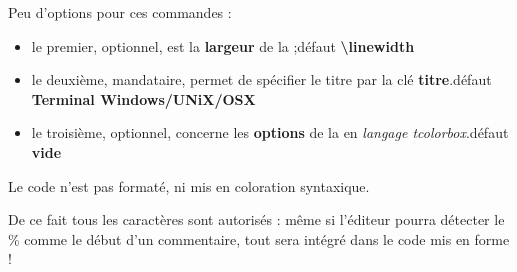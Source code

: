 \documentclass{article}
\newcommand\ctex[1]{\tcbox[vignettelatex]{#1}}
\newcommand\Cle[1]{{\bfseries\sffamily\textlangle #1\textrangle}}
\begin{document}
\begin{codecles}
Peu d'options pour ces commandes :

\begin{itemize}
	\item le premier, optionnel, est la \Cle{largeur} de la \ctex{tcbox} ;\hfill{}défaut \Cle{\textbackslash linewidth}
	\item le deuxième, mandataire, permet de spécifier le titre par la clé \Cle{titre}.\hfill{}défaut \Cle{Terminal Windows/UNiX/OSX}
	\item le troisième, optionnel, concerne les \Cle{options} de la \ctex{tcbox} en \textit{langage tcolorbox}.\hfill{}défaut \Cle{vide}
\end{itemize}
\end{codecles}

\medskip

\begin{codeinfo}
Le \textsf{code} n'est pas formaté, ni mis en coloration syntaxique.

De ce fait tous les caractères sont autorisés : même si l'éditeur pourra détecter le \% comme le début d'un commentaire, tout sera intégré dans le code mis en forme !
\end{codeinfo}

\medskip


\medskip

\begin{codesortie}
\end{codesortie}
\end{document}
